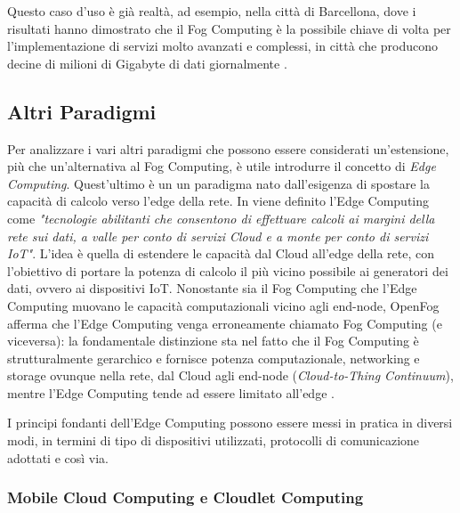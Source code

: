 Questo caso d'uso è già realtà, ad esempio, nella città di Barcellona, dove i risultati hanno dimostrato che il Fog Computing è la possibile chiave di volta per l'implementazione di servizi molto avanzati e complessi, in città che producono decine di milioni di Gigabyte di dati giornalmente \cite{FogBarcellona}. 

\subsection{Altri Paradigmi}

Per analizzare i vari altri paradigmi che possono essere considerati un'estensione, più che un'alternativa al Fog Computing, è utile introdurre il concetto di \textit{Edge Computing}. Quest'ultimo è un un paradigma nato dall'esigenza di spostare la capacità di calcolo verso l'edge della rete. In \cite{EdgeComputing} viene definito l'Edge Computing come \textit{"tecnologie abilitanti che consentono di effettuare calcoli ai margini della rete sui dati, a valle per conto di servizi Cloud e a monte per conto di servizi IoT"}. L'idea è quella di estendere le capacità dal Cloud all'edge della rete, con l'obiettivo di portare la potenza di calcolo il più vicino possibile ai generatori dei dati, ovvero ai dispositivi IoT. Nonostante sia il Fog Computing che l'Edge Computing muovano le capacità computazionali vicino agli end-node, OpenFog afferma che l'Edge Computing venga erroneamente chiamato Fog Computing (e viceversa): la fondamentale distinzione sta nel fatto che il Fog Computing è strutturalmente gerarchico e fornisce potenza computazionale, networking e storage ovunque nella rete, dal Cloud agli end-node (\textit{Cloud-to-Thing Continuum}), mentre l'Edge Computing tende ad essere limitato all'edge \cite{OpenFogReferenceArchitecture}.

I principi fondanti dell'Edge Computing possono essere messi in pratica in diversi modi, in termini di tipo di dispositivi utilizzati, protocolli di comunicazione adottati e così via.

\subsubsection{Mobile Cloud Computing e Cloudlet Computing}

